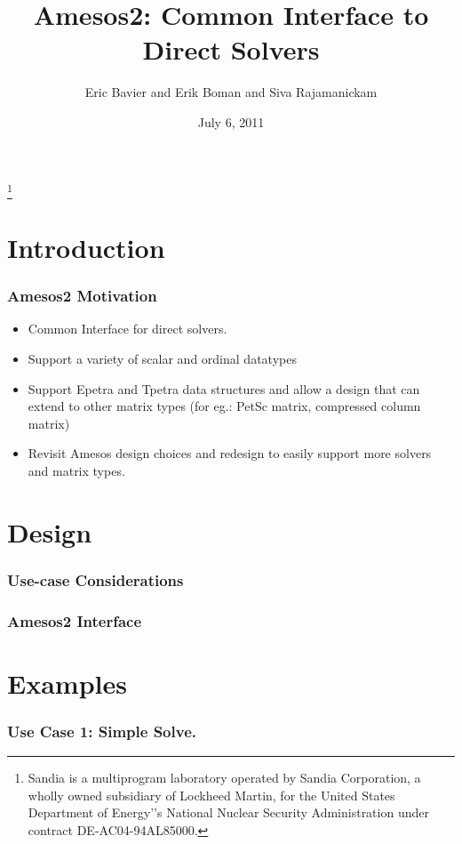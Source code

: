 \documentclass[xcolor=dvipsnames]{beamer}
\title[Amesos2]{Amesos2: Common Interface to Direct Solvers}
\author[Bavier, Boman, Rajamanickam]{Eric Bavier and Erik Boman and Siva Rajamanickam}
\institute[]{
Sandia National Laboratories
}
\date[]{July 6, 2011}
\begin{document}
\begin{frame}[plain]
  \titlepage
  \footnote{\tiny{Sandia is a multiprogram laboratory operated by Sandia Corporation, a wholly owned subsidiary of Lockheed Martin, for the United States Department of Energy'’s National Nuclear Security Administration under contract DE-AC04-94AL85000.}}
\end{frame}

\section{Introduction}

\begin{frame}
  \frametitle{Amesos2 Motivation}
  
  \begin{itemize}
  \item Common Interface for direct solvers.
    \medskip
  \item Support a variety of scalar and ordinal datatypes
    \medskip
  \item Support Epetra and Tpetra data structures and allow a design that can
    extend to other matrix types (for eg.: PetSc matrix, compressed column
    matrix)
    \medskip
  \item Revisit Amesos design choices and redesign to easily support more
    solvers and matrix types.
  \end{itemize}
    
\end{frame}

\section{Design}

\begin{frame}
  \frametitle{Use-case Considerations}
\end{frame}

\begin{frame}
  \frametitle{Amesos2 Interface}
\end{frame}

\section{Examples}

\begin{frame}
    \frametitle{Use Case 1: Simple Solve.}
\end{frame}
\end{document}
